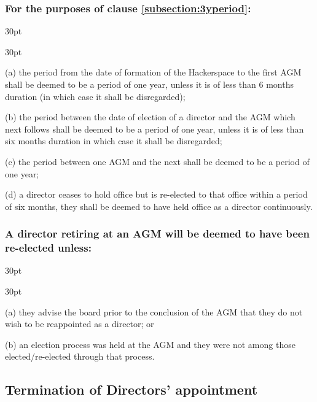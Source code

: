 \documentclass[12pt]{article}
\def\clauseindent{30pt}
\newenvironment{subindentlist}{\begin{adjustwidth}{\clauseindent}{}\begin{labeledlist}{\clauseindent}}{\end{labeledlist}\end{adjustwidth}}
\begin{document}
\subsubsection{For the purposes of clause \ref{subsection:3yperiod}:}
\begin{subindentlist}
    \item [(a)] the period from the date of formation of the Hackerspace to the first AGM shall be deemed to be a period of one year, unless it is of less than 6 months duration (in which case it shall be disregarded);
    \item [(b)] the period between the date of election of a director and the AGM which next follows shall be deemed to be a period of one year, unless it is of less than six months duration in which case it shall be disregarded;
    \item [(c)] the period between one AGM and the next shall be deemed to be a period of one year;
    \item [(d)] a director ceases to hold office but is re-elected to that office within a period of six months, they shall be deemed to have held office as a director continuously.
\end{subindentlist}
\subsubsection{A director retiring at an AGM will be deemed to have been re-elected unless:}
\begin{subindentlist}
    \item [(a)] they advise the board prior to the conclusion of the AGM that they do not wish to
be reappointed as a director; or
    \item [(b)] an election process was held at the AGM and they were not among those elected/re-elected through that process.
\end{subindentlist}

\subsection{Termination of Directors' appointment}
\end{document}
